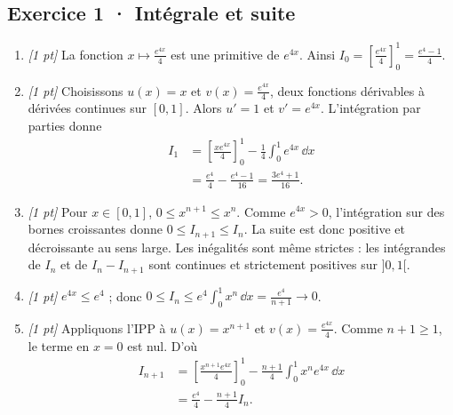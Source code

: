 \subsection*{Exercice 1 · Intégrale et suite}\begin{enumerate}

\item \textit{[1 pt]} La fonction $x\mapsto \frac{e^{4x}}{4}$ est une primitive de $e^{4x}$. Ainsi $I_0=[\frac{e^{4x}}{4}]_0^1=\frac{e^{4}-1}{4}$.

\item \textit{[1 pt]} Choisissons $u(x)=x$ et $v(x)=\frac{e^{4x}}{4}$, deux fonctions dérivables à dérivées continues sur $[0,1]$. Alors $u'=1$ et $v'=e^{4x}$. L'intégration par parties donne
\[\begin{aligned}I_1&=\left[\frac{xe^{4x}}{4}\right]_0^1-\frac{1}{4}\int_0^1e^{4x}\,\dd x\\&=\frac{e^{4}}{4}-\frac{e^{4}-1}{16}=\frac{3e^{4}+1}{16}.\end{aligned}\]

\item \textit{[1 pt]} Pour $x\in[0,1]$, $0\le x^{n+1}\le x^n$. Comme $e^{4x}>0$, l'intégration sur des bornes croissantes donne $0\le I_{n+1}\le I_n$. La suite est donc positive et décroissante au sens large. Les inégalités sont même strictes : les intégrandes de $I_n$ et de $I_n-I_{n+1}$ sont continues et strictement positives sur $]0,1[$.

\item \textit{[1 pt]} $e^{4x}\le e^{4}$ ; donc $0\le I_n\le e^{4}\int_0^1x^n\,\dd x=\frac{e^{4}}{n+1}\to0$.

\item \textit{[1 pt]} Appliquons l'IPP à $u(x)=x^{n+1}$ et $v(x)=\frac{e^{4x}}{4}$. Comme $n+1\ge1$, le terme en $x=0$ est nul. D'où
\[\begin{aligned}I_{n+1}&=\left[\frac{x^{n+1}e^{4x}}{4}\right]_0^1-\frac{n+1}{4}\int_0^1x^ne^{4x}\,\dd x\\&=\frac{e^{4}}{4}-\frac{n+1}{4}I_n.\end{aligned}\]

\end{enumerate}

